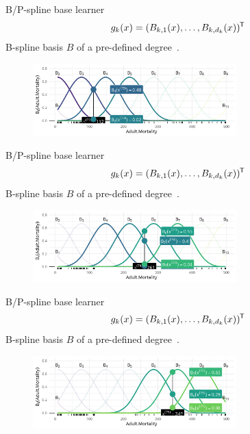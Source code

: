 \begin{frame}{B/P-spline base learner}
  \vspace{-0.3cm}\[g_k(x) = (B_{k,1}(x), \dots, B_{k,d_k}(x))^{\mkern-1.5mu\mathsf{T}}\] B-spline basis $B$ of a pre-defined degree~\citep{eilers1996flexible}.
  \begin{center}
    \begin{figure}
      \includegraphics[width=0.7\textwidth]{figures/bs-base/fig-bs70.png}
    \end{figure}
  \end{center}
  
  \addtocounter{framenumber}{-1}
\end{frame}


\begin{frame}{B/P-spline base learner}
  \vspace{-0.3cm}\[g_k(x) = (B_{k,1}(x), \dots, B_{k,d_k}(x))^{\mkern-1.5mu\mathsf{T}}\] B-spline basis $B$ of a pre-defined degree~\citep{eilers1996flexible}.
  \begin{center}
    \begin{figure}
      \includegraphics[width=0.7\textwidth]{figures/bs-base/fig-bs5.png}
    \end{figure}
  \end{center}
  
  \addtocounter{framenumber}{-1}
\end{frame}


\begin{frame}{B/P-spline base learner}
  \vspace{-0.3cm}\[g_k(x) = (B_{k,1}(x), \dots, B_{k,d_k}(x))^{\mkern-1.5mu\mathsf{T}}\] B-spline basis $B$ of a pre-defined degree~\citep{eilers1996flexible}.
  \begin{center}
    \begin{figure}
      \includegraphics[width=0.7\textwidth]{figures/bs-base/fig-bs10.png}
    \end{figure}
  \end{center}
  
  \addtocounter{framenumber}{-1}
\end{frame}

